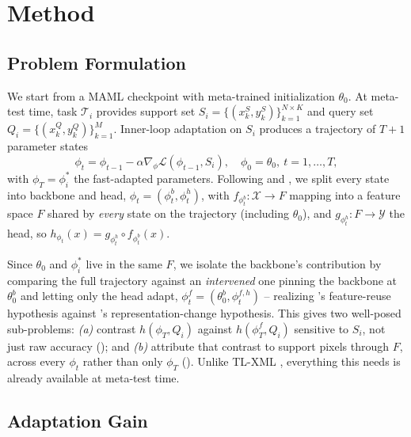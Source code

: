 \section{Method}
\label{sec:method}

\subsection{Problem Formulation}
\label{sec:problem}

We start from a MAML checkpoint with meta-trained initialization $\theta_0$. At meta-test time, task $\mathcal{T}_i$ provides support set $S_i=\{(x_k^S,y_k^S)\}_{k=1}^{N\times K}$ and query set $Q_i=\{(x_k^Q,y_k^Q)\}_{k=1}^{M}$. Inner-loop adaptation on $S_i$ produces a trajectory of $T{+}1$ parameter states
\begin{equation}
    \phi_{t} = \phi_{t-1} - \alpha \nabla_{\phi} \mathcal{L}(\phi_{t-1}, S_i), \quad \phi_0=\theta_0,\ t=1,\dots,T,
    \label{eq:inner_loop}
\end{equation}
with $\phi_T=\phi_i^*$ the fast-adapted parameters. Following \citet{raghu2019rapid} and \citet{oh2020boil}, we split every state into backbone and head, $\phi_t=(\phi_t^{b},\phi_t^{h})$, with $f_{\phi_t^b}\!:\mathcal{X}\!\to\!F$ mapping into a feature space $F$ shared by \emph{every} state on the trajectory (including $\theta_0$), and $g_{\phi_t^h}\!:\!F\!\to\!\mathcal{Y}$ the head, so $h_{\phi_t}(x)=g_{\phi_t^h}\!\circ\! f_{\phi_t^b}(x)$.

Since $\theta_0$ and $\phi_i^*$ live in the same $F$, we isolate the backbone's contribution by comparing the full trajectory against an \emph{intervened} one pinning the backbone at $\theta_0^{b}$ and letting only the head adapt, $\phi_t^{f}=(\theta_0^{b},\phi_t^{f,h})$ -- realizing \citeauthor{raghu2019rapid}'s feature-reuse hypothesis against \citeauthor{oh2020boil}'s representation-change hypothesis. This gives two well-posed sub-problems: \emph{(a)} contrast $h(\phi_T,Q_i)$ against $h(\phi_T^{f},Q_i)$ sensitive to $S_i$, not just raw accuracy (); and \emph{(b)} attribute that contrast to support pixels through $F$, across every $\phi_{t}$ rather than only $\phi_T$ (). Unlike TL-XML \citep{mitsuka2025tlxml}, everything this needs is already available at meta-test time.

\subsection{Adaptation Gain}
\label{sec:adaptation_gain}

